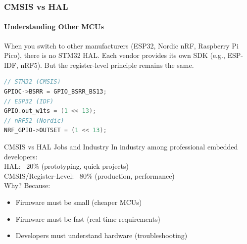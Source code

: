 \documentclass{beamer}
\begin{document}
\begin{frame}[fragile]
	\frametitle{CMSIS vs HAL}
	\framesubtitle{Understanding Other MCUs}
	When you switch to other manufacturers (ESP32, Nordic nRF, Raspberry Pi Pico),	there is no STM32 HAL. Each vendor provides its own SDK (e.g., ESP-IDF, nRF5).
	But the register-level principle remains the same.
	\begin{lstlisting}[language=C]
// STM32 (CMSIS)
GPIOC->BSRR = GPIO_BSRR_BS13;
// ESP32 (IDF)
GPIO.out_w1ts = (1 << 13);
// nRF52 (Nordic)
NRF_GPIO->OUTSET = (1 << 13);
	\end{lstlisting}
\end{frame}
\begin{frame}{CMSIS vs HAL}
	{Jobs and Industry}
	In industry among professional embedded developers:\\
	\vspace{0.2cm}
	HAL: ~20\% (prototyping, quick projects)\\
	CMSIS/Register-Level: ~80\% (production, performance)\\
	\vspace{0.2cm}
	Why? Because:
	\begin{itemize}
		\item Firmware must be small (cheaper MCUs)
		\item Firmware must be fast (real-time requirements)
		\item Developers must understand hardware (troubleshooting)
	\end{itemize}
\end{frame}
\end{document}
